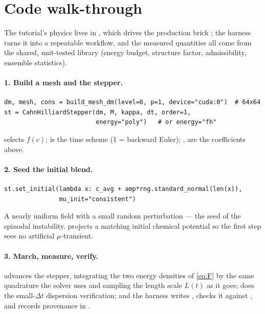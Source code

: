 \section{Code walk-through}

The tutorial's physics lives in , which drives the
production brick ; the
harness  turns it into a repeatable workflow, and
the measured quantities all come from the shared, unit-tested
 library (energy budget, structure
factor, admissibility, ensemble statistics).

\paragraph{1. Build a mesh and the stepper.}
\begin{lstlisting}
dm, mesh, cons = build_mesh_dm(level=6, p=1, device="cuda:0")  # 64x64
st = CahnHilliardStepper(dm, M, kappa, dt, order=1,
                         energy="poly")   # or energy="fh"
\end{lstlisting}
 selects $f(c)$;  is the time scheme (1 =
backward Euler); ,  are the coefficients above.

\paragraph{2. Seed the initial blend.}
\begin{lstlisting}
st.set_initial(lambda x: c_avg + amp*rng.standard_normal(len(x)),
               mu_init="consistent")
\end{lstlisting}
A nearly uniform field with a small random perturbation --- the seed of
the spinodal instability.  projects a
matching initial chemical potential so the first step sees no artificial
$\mu$-transient.

\paragraph{3. March, measure, verify.}  advances the
stepper, integrating the two energy densities of \eqref{eq:F} by the
same quadrature the solver uses and sampling the length scale $L(t)$ as
it goes;  does the small-$\Delta t$ dispersion
verification; and the harness writes , checks it
against , and records provenance in
.


